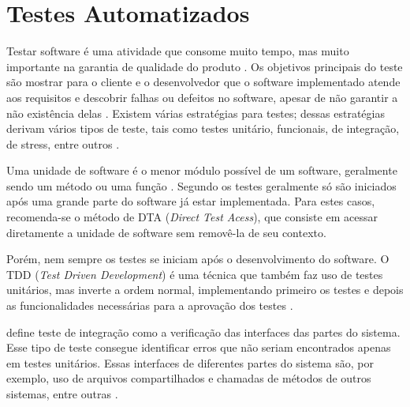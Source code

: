 \section{Testes Automatizados}

Testar software é uma atividade que consome muito tempo, mas muito importante na garantia de qualidade do produto \cite{testing-is-hard}. Os objetivos principais do teste são mostrar para o cliente e o desenvolvedor que o software implementado atende aos requisitos e descobrir falhas ou defeitos no software, apesar de não garantir a não existência delas \cite{sommerville}. Existem várias estratégias para testes; dessas estratégias derivam vários tipos de teste, tais como testes unitário, funcionais, de integração, de stress, entre outros \cite{art-of-testing}.

Uma unidade de software é o menor módulo possível de um software, geralmente sendo um método ou uma função \cite{runeson}. Segundo  os testes geralmente só são iniciados após uma grande parte do software já estar implementada. Para estes casos, recomenda-se o método de DTA (\textit{Direct Test Acess}), que consiste em acessar diretamente a unidade de software sem removê-la de seu contexto.

Porém, nem sempre os testes se iniciam após o desenvolvimento do software. O TDD (\textit{Test Driven Development}) é uma técnica que também faz uso de testes unitários, mas inverte a ordem normal, implementando primeiro os testes e depois as funcionalidades necessárias para a aprovação dos testes \cite{tdd}.

 define teste de integração como a verificação das interfaces das partes do sistema. Esse tipo de teste consegue identificar erros que não seriam encontrados apenas em testes unitários. Essas interfaces de diferentes partes do sistema são, por exemplo, uso de arquivos compartilhados e chamadas de métodos de outros sistemas, entre outras \cite{spillner}.


